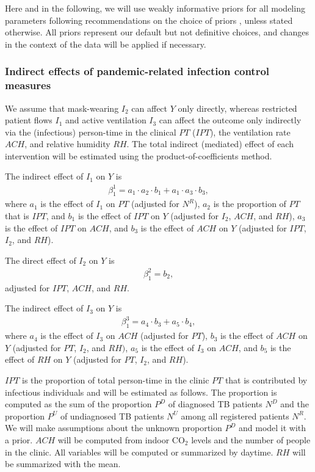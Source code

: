 \documentclass{article}
\begin{document}
Here and in the following, we will use weakly informative priors for all modeling parameters following recommendations on the choice of priors \cite{Gelman2008AAS,Gelman2008StatMed,Gelman2020RegOther,Stan2022,Gabry2023Priors}, unless stated otherwise. All priors represent our default but not definitive choices, and changes in the context of the data will be applied if necessary.

\subsubsection*{Indirect effects of pandemic-related infection control measures}

We assume that mask-wearing $I_2$ can affect $Y$ only  directly, whereas restricted patient flows $I_1$ and active ventilation $I_3$ can affect the outcome only indirectly via the (infectious) person-time in the clinical $PT$ ($IPT$), the ventilation rate $ACH$, and relative humidity $RH$. The total indirect (mediated) effect of each intervention will be estimated using the product-of-coefficients method.

The indirect effect of $I_1$ on $Y$ is 
\begin{align*}
    \beta_1^1 = a_1 \cdot a_2 \cdot b_1 + a_1 \cdot a_3 \cdot b_3,
\end{align*}
where $a_1$ is the effect of $I_1$ on $PT$ (adjusted for $N^R$), $a_2$ is the proportion of $PT$ that is $IPT$, and $b_1$ is the effect of $IPT$ on $Y$ (adjusted for $I_2$, $ACH$, and $RH$), $a_3$ is the effect of $IPT$ on $ACH$, and $b_3$ is the effect of $ACH$ on $Y$ (adjusted for $IPT$, $I_2$, and $RH$). 

The direct effect of $I_2$ on $Y$ is
\begin{align*}
    \beta_1^2 = b_2,
\end{align*}
adjusted for $IPT$, $ACH$, and $RH$.

The indirect effect of $I_3$ on $Y$ is
\begin{align*}
    \beta_1^3 = a_4 \cdot b_3 + a_5 \cdot b_4,
\end{align*}
where $a_4$ is the effect of $I_3$ on $ACH$ (adjusted for $PT$), $b_3$ is the effect of $ACH$ on $Y$ (adjusted for $PT$, $I_2$, and $RH)$, $a_5$ is the effect of $I_3$ on $ACH$, and $b_5$ is the effect of $RH$ on $Y$ (adjusted for $PT$, $I_2$, and $RH$).

$IPT$ is the proportion of total person-time in the clinic $PT$ that is contributed by infectious individuals and will be estimated as follows. The proportion is computed as the sum of the proportion $P^D$ of diagnosed TB patients $N^D$ and the proportion $P^U$ of undiagnosed TB patients $N^U$ among all registered patients $N^R$. We will make assumptions about the unknown proportion $P^D$ and model it with a prior. $ACH$ will be computed from indoor CO$_2$ levels and the number of people in the clinic. All variables will be computed or summarized by daytime. $RH$ will be summarized with the mean. 
\end{document}
